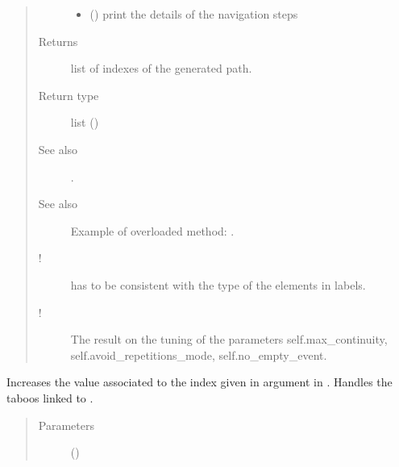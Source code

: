 \documentclass[letterpaper,10pt,english]{sphinxmanual}
\begin{document}
\begin{fulllineitems}
\begin{fulllineitems}
\begin{quote}
\begin{description}
\begin{itemize}
\item {} 
 () \textendash{} print the details of the navigation steps

\end{itemize}

\item[{Returns}] \leavevmode
list of indexes of the generated path.

\item[{Return type}] \leavevmode
list ()

\item[{See also}] \leavevmode
{\hyperref[\detokenize{index:Navigator.Navigator.simply_guided_generation}]{}}.

\item[{See also}] \leavevmode
Example of overloaded method: .

\item[{!}] \leavevmode
{} has to be consistent with the type of the elements in labels.

\item[{!}] \leavevmode
The result  on the tuning of the parameters self.max\_continuity, self.avoid\_repetitions\_mode, self.no\_empty\_event.

\end{description}\end{quote}

\end{fulllineitems}


\begin{fulllineitems}
\label{\detokenize{index:Navigator.Navigator.update_history_and_taboos}}
Increases the value associated to the index given in argument in .
Handles the taboos linked to .
\begin{quote}\begin{description}
\item[{Parameters}] \leavevmode
{} () \textendash{} 

\end{description}\end{quote}

\end{fulllineitems}


\end{fulllineitems}
\end{document}
